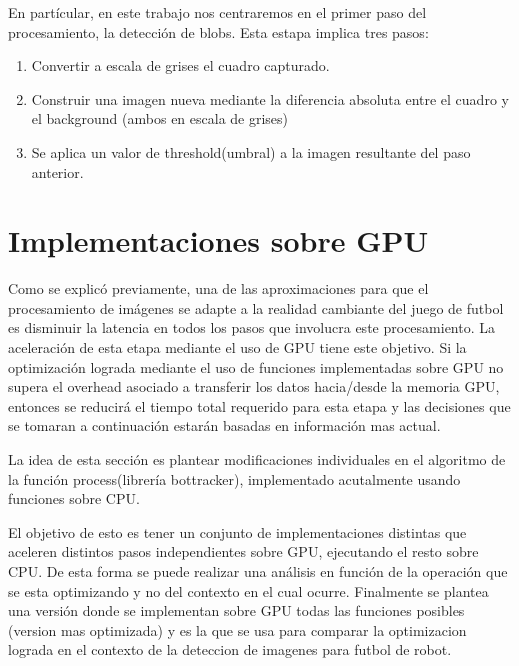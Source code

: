 \documentclass[a4paper,10pt]{report}
\begin{document}
En partícular, en este trabajo nos centraremos en el primer paso del procesamiento, la detección de blobs. Esta estapa implica tres pasos:

\begin{enumerate}
 \item Convertir a escala de grises el cuadro capturado.
 \item Construir una imagen nueva mediante la diferencia absoluta entre el cuadro y el background (ambos en escala de grises)
 \item Se aplica un valor de threshold(umbral) a la imagen resultante del paso anterior. 
\end{enumerate}






\section{Implementaciones sobre GPU}


Como se explicó previamente, una de las aproximaciones para que el procesamiento de imágenes se adapte a la realidad cambiante
del juego de futbol es disminuir la latencia en todos los pasos que involucra este procesamiento.
La aceleración de esta etapa mediante el uso de GPU tiene este objetivo. 
Si la optimización lograda mediante el uso de funciones implementadas sobre GPU no supera el overhead asociado a transferir los datos hacia/desde
la memoria GPU, entonces se reducirá el tiempo total requerido para esta etapa y las decisiones que se tomaran a continuación estarán basadas en información mas actual.

La idea de esta sección es plantear modificaciones individuales en el algoritmo de la función process(librería bottracker), implementado acutalmente usando funciones sobre CPU.


El objetivo de esto es tener un conjunto de implementaciones distintas que aceleren distintos pasos independientes sobre GPU, ejecutando el resto sobre CPU.
De esta forma se puede realizar una análisis en función de la operación que se esta optimizando y no del contexto en el cual ocurre.
Finalmente se plantea una versión donde se implementan sobre GPU todas las funciones posibles (version mas optimizada) y es la que se usa para comparar la optimizacion lograda en el contexto de la deteccion de imagenes para futbol de robot.
\end{document}
